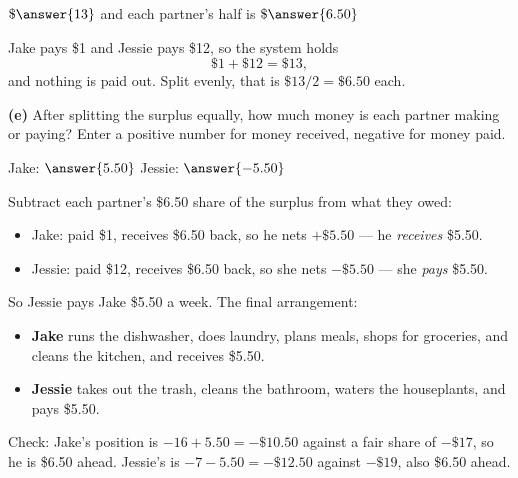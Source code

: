 \documentclass[12pt]{ximera}
\begin{document}
\begin{problem}
\begin{prompt}
$\$\answer{13}$ \qquad and each partner's half is $\$\answer{6.50}$

\begin{solution}
Jake pays \$1 and Jessie pays \$12, so the system holds
\[ \$1 + \$12 = \$13, \]
and nothing is paid out. Split evenly, that is $\$13/2 = \$6.50$ each.
\end{solution}
\end{prompt}

\begin{prompt}
\textbf{(e)} After splitting the surplus equally, how much money is each partner making
or paying? Enter a positive number for money received, negative for money paid.

Jake: $\answer{5.50}$ \qquad Jessie: $\answer{-5.50}$

\begin{solution}
Subtract each partner's \$6.50 share of the surplus from what they owed:
\begin{itemize}
\item Jake: paid \$1, receives \$6.50 back, so he nets $+\$5.50$ --- he \emph{receives}
      \$5.50.
\item Jessie: paid \$12, receives \$6.50 back, so she nets $-\$5.50$ --- she
      \emph{pays} \$5.50.
\end{itemize}

So Jessie pays Jake \$5.50 a week. The final arrangement:
\begin{itemize}
\item \textbf{Jake} runs the dishwasher, does laundry, plans meals, shops for
      groceries, and cleans the kitchen, and receives \$5.50.
\item \textbf{Jessie} takes out the trash, cleans the bathroom, waters the houseplants,
      and pays \$5.50.
\end{itemize}
Check: Jake's position is $-16 + 5.50 = -\$10.50$ against a fair share of $-\$17$, so he
is \$6.50 ahead. Jessie's is $-7 - 5.50 = -\$12.50$ against $-\$19$, also \$6.50 ahead.
\checkmark
\end{solution}
\end{prompt}
\end{problem}
\end{document}
